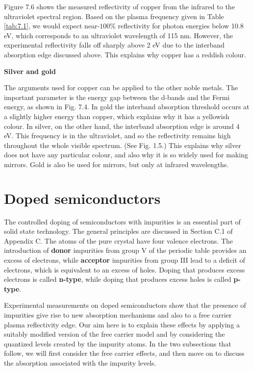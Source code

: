 \documentclass[12pt]{book}
\begin{document}
{Figure 7.6 shows the measured reflectivity of copper from the infrared to the ultraviolet spectral region. Based on the plasma frequency given in Table \ref{tab:7.1}, we would expect near-$100\%$ reflectivity for photon energies below 10.8 eV, which corresponds to an ultraviolet wavelength of 115 nm. However, the experimental reflectivity falls off sharply above 2 eV due to the interband absorption edge discussed above. This explains why copper has a reddish colour.

\textbf{Silver and gold}

The arguments used for copper can be applied to the other noble metals. The important parameter is the energy gap between the d-bands and the Fermi energy, as shown in Fig. 7.4. In gold the interband absorption threshold occurs at a slightly higher energy than copper, which explains why it has a yellowish colour. In silver, on the other hand, the interband absorption edge is around 4 eV. This frequency is in the ultraviolet, and so the reflectivity remains high throughout the whole visible spectrum. (See Fig. 1.5.) This explains why silver does not have any particular colour, and also why it is so widely used for making mirrors. Gold is also be used for mirrors, but only at infrared wavelengths.

\section{Doped semiconductors}
The controlled doping of semiconductors with impurities is an essential part of solid state technology. The general principles are discussed in Section C.1 of Appendix C. The atoms of the pure crystal have four valence electrons. The introduction of \textbf{donor} impurities from group V of the periodic table provides an excess of electrons, while \textbf{acceptor} impurities from group III lead to a deficit of electrons, which is equivalent to an excess of holes. Doping that produces excess electrons is called \textbf{n-type}, while doping that produces excess holes is called \textbf{p-type}.

Experimental measurements on doped semiconductors show that the presence of impurities give rise to new absorption mechanisms and also to a free carrier plasma reflectivity edge. Our aim here is to explain these effects by applying a suitably modified version of the free carrier model and by considering the quantized levels created by the impurity atoms. In the two subsections that follow, we will first consider the free carrier effects, and then move on to discuss the absorption associated with the impurity levels.
}
\end{document}
